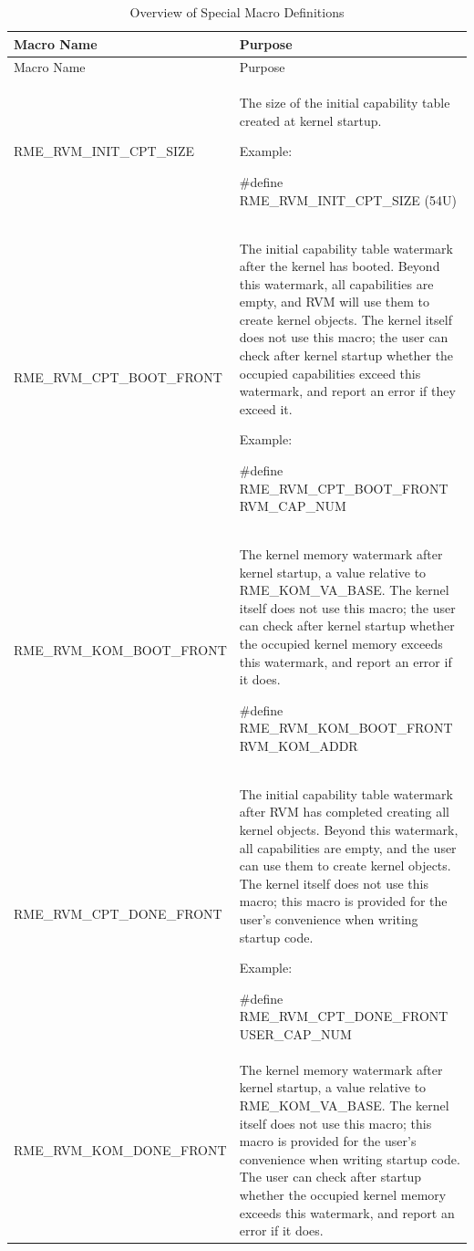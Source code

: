 \begin{xltabular}{\textwidth}{@{}>{\hsize\raggedright\arraybackslash}X>{\hsize\raggedright\arraybackslash}X@{}}
\caption{Overview of Special Macro Definitions}\label{tab:7-3-special-macro-definitions-overview}\\
\toprule
Macro Name & Purpose\tabularnewline
\endfirsthead
\toprule
Macro Name & Purpose\tabularnewline
\midrule
\endhead
\bottomrule
\endlastfoot
RME\_RVM\_INIT\_CPT\_SIZE\strut
 & The size of the initial capability table created at kernel startup.

Example:

\#define RME\_RVM\_INIT\_CPT\_SIZE (54U)\strut
\tabularnewline
RME\_RVM\_CPT\_BOOT\_FRONT\strut
 & The initial capability table watermark after the kernel has booted. Beyond this watermark, all capabilities are empty, and RVM will use them to create kernel objects. The kernel itself does not use this macro; the user can check after kernel startup whether the occupied capabilities exceed this watermark, and report an error if they exceed it.

Example:

\#define RME\_RVM\_CPT\_BOOT\_FRONT RVM\_CAP\_NUM\strut
\tabularnewline
RME\_RVM\_KOM\_BOOT\_FRONT\strut
 & The kernel memory watermark after kernel startup, a value relative to RME\_KOM\_VA\_BASE. The kernel itself does not use this macro; the user can check after kernel startup whether the occupied kernel memory exceeds this watermark, and report an error if it does.

\#define RME\_RVM\_KOM\_BOOT\_FRONT RVM\_KOM\_ADDR\strut
\tabularnewline
RME\_RVM\_CPT\_DONE\_FRONT\strut
 & The initial capability table watermark after RVM has completed creating all kernel objects. Beyond this watermark, all capabilities are empty, and the user can use them to create kernel objects. The kernel itself does not use this macro; this macro is provided for the user's convenience when writing startup code.

Example:

\#define RME\_RVM\_CPT\_DONE\_FRONT USER\_CAP\_NUM\strut
\tabularnewline
RME\_RVM\_KOM\_DONE\_FRONT\strut
 & The kernel memory watermark after kernel startup, a value relative to RME\_KOM\_VA\_BASE. The kernel itself does not use this macro; this macro is provided for the user's convenience when writing startup code. The user can check after startup whether the occupied kernel memory exceeds this watermark, and report an error if it does.


\end{xltabular}
